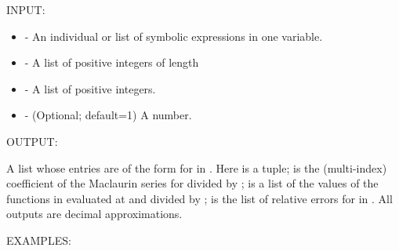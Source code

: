 \documentclass[letterpaper,12pt,openany,oneside]{sphinxmanual}
\begin{document}
\begin{fulllineitems}
\begin{fulllineitems}
INPUT:
\begin{itemize}
\item {} 
 - An individual or list of symbolic expressions in
one variable.

\item {} 
 - A list of positive integers of length

\item {} 
 - A list of positive integers.

\item {} 
 - (Optional; default=1) A number.

\end{itemize}

OUTPUT:

A list whose entries are of the form
 for  in .
Here  is a tuple;  is the  (multi-index)
coefficient of the Maclaurin series for  divided by
;
 is a list of the values of the functions in 
evaluated at  and divided by ;
 is the list of relative errors
 for  in .
All outputs are decimal approximations.

EXAMPLES:


\end{fulllineitems}
\end{fulllineitems}
\end{document}
